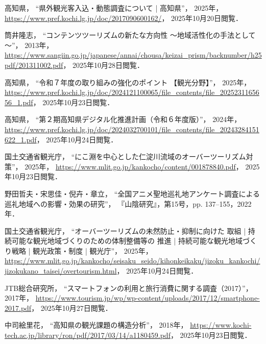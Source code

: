 \documentclass{docs}
\begin{document}
\begin{thebibliography}{99}
	高知県，
	“県外観光客入込・動態調査について | 高知県”，
	2025年，
	\url{https://www.pref.kochi.lg.jp/doc/2017090600162/}，
	2025年10月20日閲覧．

	筒井隆志，
	“コンテンツツーリズムの新たな方向性 ～地域活性化の手法として～”，
	2013年，
	\url{https://www.sangiin.go.jp/japanese/annai/chousa/keizai_prism/backnumber/h25pdf/201311002.pdf}，
	2025年10月28日閲覧．

	高知県，
	“令和７年度の取り組みの強化のポイント 【観光分野】”，
	2025年，
	\url{https://www.pref.kochi.lg.jp/doc/2024121100065/file_contents/file_2025231165656_1.pdf}，
	2025年10月23日閲覧．

	高知県，
	“第２期高知県デジタル化推進計画（令和６年度版）”，
	2024年，
	\url{https://www.pref.kochi.lg.jp/doc/2024032700101/file_contents/file_20243284151622_1.pdf}，
	2025年10月24日閲覧．

	国土交通省観光庁，
	“にこ淵を中心とした仁淀川流域のオーバーツーリズム対策”，
	2025年，
	\url{https://www.mlit.go.jp/kankocho/content/001878840.pdf}，
	2025年10月23日閲覧．

	野田哲夫・宋思佳・倪卉・章立，
	“全国アニメ聖地巡礼地アンケート調査による
	巡礼地域への影響・効果の研究”，
	『山陰研究』，第15号，pp. 137--155，2022年．

	国土交通省観光庁，
	“オーバーツーリズムの未然防止・抑制に向けた
	取組 | 持続可能な観光地域づくりのための体制整備等の
	推進 | 持続可能な観光地域づくり戦略 | 観光政策・制度 | 観光庁”，
	2025年，
	\url{https://www.mlit.go.jp/kankocho/seisaku_seido/kihonkeikaku/jizoku_kankochi/jizokukano_taisei/overtourism.html}，
	2025年10月24日閲覧．

	JTB総合研究所，
	“スマートフォンの利用と旅行消費に関する調査（2017）”，
	2017年，
	\url{https://www.tourism.jp/wp/wp-content/uploads/2017/12/smartphone-2017.pdf}，
	2025年10月27日閲覧．

	中司絵里花，
	“高知県の観光課題の構造分析”，
	2018年，
	\url{https://www.kochi-tech.ac.jp/library/ron/pdf/2017/03/14/a1180459.pdf}，
	2025年10月23日閲覧．


\end{thebibliography}
\end{document}
